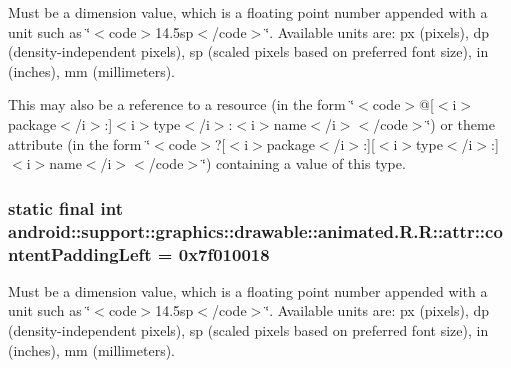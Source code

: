Must be a dimension value, which is a floating point number appended with a unit such as \char`\"{}$<$code$>$14.5sp$<$/code$>$\char`\"{}. Available units are: px (pixels), dp (density-independent pixels), sp (scaled pixels based on preferred font size), in (inches), mm (millimeters). 

This may also be a reference to a resource (in the form \char`\"{}$<$code$>$@\mbox{[}$<$i$>$package$<$/i$>$:\mbox{]}$<$i$>$type$<$/i$>$:$<$i$>$name$<$/i$>$$<$/code$>$\char`\"{}) or theme attribute (in the form \char`\"{}$<$code$>$?\mbox{[}$<$i$>$package$<$/i$>$:\mbox{]}\mbox{[}$<$i$>$type$<$/i$>$:\mbox{]}$<$i$>$name$<$/i$>$$<$/code$>$\char`\"{}) containing a value of this type. \hypertarget{classandroid_1_1support_1_1graphics_1_1drawable_1_1animated_1_1_r_1_1attr_2a44c542de0dfa0a169d3d8caa1a7511}{
\subsubsection[{contentPaddingLeft}]{\setlength{\rightskip}{0pt plus 5cm}static final int android::support::graphics::drawable::animated.R.R::attr::contentPaddingLeft = 0x7f010018}}
\label{classandroid_1_1support_1_1graphics_1_1drawable_1_1animated_1_1_r_1_1attr_2a44c542de0dfa0a169d3d8caa1a7511}


Must be a dimension value, which is a floating point number appended with a unit such as \char`\"{}$<$code$>$14.5sp$<$/code$>$\char`\"{}. Available units are: px (pixels), dp (density-independent pixels), sp (scaled pixels based on preferred font size), in (inches), mm (millimeters). 

